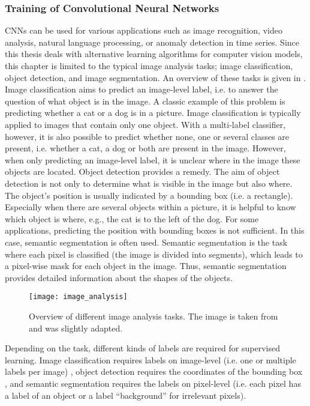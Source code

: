 \subsubsection{Training of Convolutional Neural Networks}
CNNs can be used for various applications such as image recognition, video analysis, natural language processing, or anomaly detection in time series.
Since this thesis deals with alternative learning algorithms for computer vision models, this chapter is limited to the typical image analysis tasks; image classification, object detection, and image segmentation.
An overview of these tasks is given in .
Image classification aims to predict an image-level label, i.e. to answer the question of what object is in the image.
A classic example of this problem is predicting whether a cat or a dog is in a picture.
Image classification is typically applied to images that contain only one object.
With a multi-label classifier, however, it is also possible to predict whether none, one or several classes are present, i.e. whether a cat, a dog or both are present in the image.
However, when only predicting an image-level label, it is unclear where in the image these objects are located.
Object detection provides a remedy.
The aim of object detection is not only to determine what is visible in the image but also where.
The object's position is usually indicated by a bounding box (i.e. a rectangle).
Especially when there are several objects within a picture, it is helpful to know which object is where, e.g., the cat is to the left of the dog.
For some applications, predicting the position with bounding boxes is not sufficient.
In this case, semantic segmentation is often used.
Semantic segmentation is the task where each pixel is classified (the image is divided into segments), which leads to a pixel-wise mask for each object in the image.
Thus, semantic segmentation provides detailed information about the shapes of the objects.

\begin{figure}[h]
    \centering
    \texttt{[image: image\_analysis]}
    \caption[Overview of different image analysis tasks]{Overview of different image analysis tasks. The image is taken from  and was slightly adapted.}
\end{figure}

Depending on the task, different kinds of labels are required for supervised learning.
Image classification requires labels on image-level (i.e. one or multiple labels per image) \cite{Lecun_Bottou_Bengio_Haffner_1998, NIPS2012_c399862d, Simonyan_Zisserman_2015, Szegedy_Liu_Jia_Sermanet_Reed_Anguelov_Erhan_Vanhoucke_Rabinovich_2014, He_Zhang_Ren_Sun_2016}, object detection requires the coordinates of the bounding box \cite{Redmon_Divvala_Girshick_Farhadi_2016, Liu_Anguelov_Erhan_Szegedy_Reed_Fu_Berg_2016, He_Gkioxari_Dollar_Girshick_2017}, and semantic segmentation requires the labels on pixel-level \cite{Ronneberger_Fischer_Brox_2015, Wu_Zhang_Huang_Liang_Yu_2019} (i.e. each pixel has a label of an object or a label ``background'' for irrelevant pixels).

